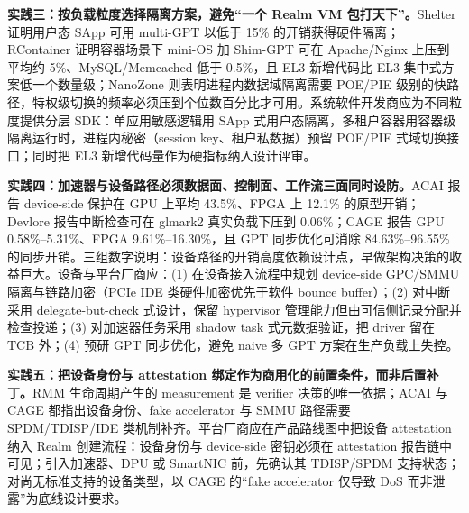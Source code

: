 \documentclass[11pt]{ctexart}
\begin{document}
\noindent\textbf{实践三：按负载粒度选择隔离方案，避免“一个 Realm VM 包打天下”。}Shelter 证明用户态 SApp 可用 multi-GPT 以低于 15\% 的开销获得硬件隔离\cite{zhang2023shelter}；RContainer 证明容器场景下 mini-OS 加 Shim-GPT 可在 Apache/Nginx 上压到平均约 5\%、MySQL/Memcached 低于 0.5\%，且 EL3 新增代码比 EL3 集中式方案低一个数量级\cite{zhou2025rcontainer}；NanoZone 则表明进程内数据域隔离需要 POE/PIE 级别的快路径，特权级切换的频率必须压到个位数百分比才可用\cite{liu2025nanozone}。系统软件开发商应为不同粒度提供分层 SDK：单应用敏感逻辑用 SApp 式用户态隔离，多租户容器用容器级隔离运行时，进程内秘密（session key、租户私数据）预留 POE/PIE 式域切换接口；同时把 EL3 新增代码量作为硬指标纳入设计评审。\par
\noindent\textbf{实践四：加速器与设备路径必须数据面、控制面、工作流三面同时设防。}ACAI 报告 device-side 保护在 GPU 上平均 43.5\%、FPGA 上 12.1\% 的原型开销\cite{acai2023}；Devlore 报告中断检查可在 glmark2 真实负载下压到 0.06\%\cite{bertschi2026devlore}；CAGE 报告 GPU 0.58\%--5.31\%、FPGA 9.61\%--16.30\%，且 GPT 同步优化可消除 84.63\%--96.55\% 的同步开销\cite{wang2026cage}。三组数字说明：设备路径的开销高度依赖设计点，早做架构决策的收益巨大。设备与平台厂商应：(1) 在设备接入流程中规划 device-side GPC/SMMU 隔离与链路加密（PCIe IDE 类硬件加密优先于软件 bounce buffer）；(2) 对中断采用 delegate-but-check 式设计，保留 hypervisor 管理能力但由可信侧记录分配并检查投递；(3) 对加速器任务采用 shadow task 式元数据验证，把 driver 留在 TCB 外；(4) 预研 GPT 同步优化，避免 naive 多 GPT 方案在生产负载上失控。\par
\noindent\textbf{实践五：把设备身份与 attestation 绑定作为商用化的前置条件，而非后置补丁。}RMM 生命周期产生的 measurement 是 verifier 决策的唯一依据\cite{arm_rmm_spec}；ACAI 与 CAGE 都指出设备身份、fake accelerator 与 SMMU 路径需要 SPDM/TDISP/IDE 类机制补齐\cite{acai2023,wang2026cage}。平台厂商应在产品路线图中把设备 attestation 纳入 Realm 创建流程：设备身份与 device-side 密钥必须在 attestation 报告链中可见；引入加速器、DPU 或 SmartNIC 前，先确认其 TDISP/SPDM 支持状态；对尚无标准支持的设备类型，以 CAGE 的“fake accelerator 仅导致 DoS 而非泄露”为底线设计要求。\par
\end{document}
